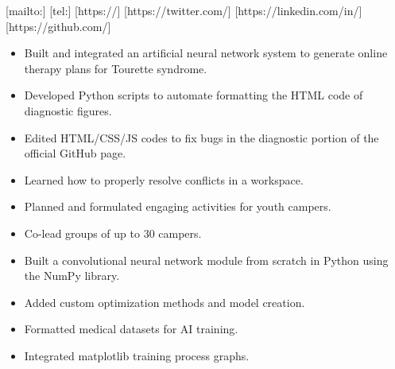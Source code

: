 \documentclass[10pt,a4paper,ragged2e,withhyper]{altacv}
\begin{document}


[mailto:]
[tel:]
[https://]
[https://twitter.com/]
[https://linkedin.com/in/]
[https://github.com/]


\makecvheader

\begin{paracol}{2}


\begin{itemize}
\item Built and integrated an artificial neural network system to \newline generate online therapy plans for Tourette syndrome.
\item Developed Python scripts to automate formatting the HTML code of diagnostic figures.
\item Edited HTML/CSS/JS codes to fix bugs in the diagnostic portion of the official GitHub page.
\end{itemize}

\divider

\begin{itemize}
\item Learned how to properly resolve conflicts in a workspace. 
\item Planned and formulated engaging activities for youth campers.
\item Co-lead groups of up to 30 campers.
\end{itemize}


\begin{itemize}
\item Built a convolutional neural network module from scratch in Python using the NumPy library.
\item Added custom optimization methods and model creation.
\item Formatted medical datasets for AI training.
\item Integrated matplotlib training process graphs.
\end{itemize}


\end{paracol}
\end{document}
